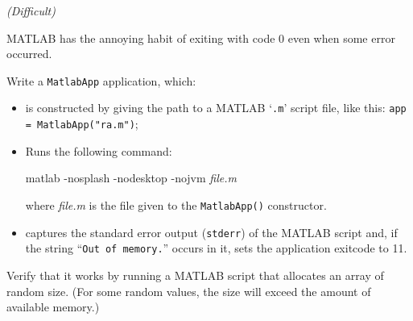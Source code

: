 \documentclass[english,serif,mathserif,xcolor=pdftex,dvipsnames,table]{beamer}
\begin{document}
\begin{frame}[fragile]
  \begin{exercise*}[3.C] \emph{(Difficult)} \small

    MATLAB has the annoying habit of exiting with code 0 even when some error occurred.

    \+
    Write a \texttt{MatlabApp} application, which:
    \begin{itemize}
    \item is constructed by giving the path to a MATLAB `\texttt{.m}'
      script file, like this: \texttt{app = MatlabApp("ra.m")};
    \item Runs the following command:
\begin{semiverbatim}
matlab -nosplash -nodesktop -nojvm \emph{file.m}
\end{semiverbatim}
      where \emph{file.m} is the file given to the
      \texttt{MatlabApp()} constructor.
    \item captures the standard error output (\texttt{stderr}) of the
      MATLAB script and, if the string ``\texttt{Out of memory.}''
      occurs in it, sets the application exitcode to 11.
    \end{itemize}

    Verify that it works by running a MATLAB script that allocates an
    array of random size. (For some random values, the size will
    exceed the amount of available memory.)
  \end{exercise*}
\end{frame}
\end{document}
